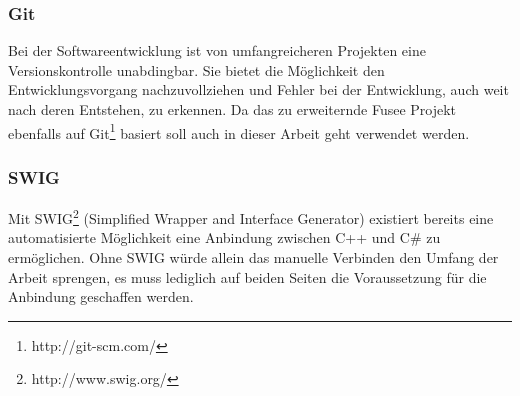 \subsubsection{Git}
Bei der Softwareentwicklung ist von umfangreicheren Projekten eine Versionskontrolle unabdingbar. Sie bietet die Möglichkeit den Entwicklungsvorgang nachzuvollziehen und Fehler bei der Entwicklung, auch weit nach deren Entstehen, zu erkennen. Da das zu erweiternde Fusee Projekt ebenfalls auf Git\footnote{http://git-scm.com/} basiert soll auch in dieser Arbeit geht verwendet werden.
\cite{Loeliger.2012}

\subsubsection{SWIG}
Mit SWIG\footnote{http://www.swig.org/} (Simplified Wrapper and Interface Generator) existiert bereits eine automatisierte Möglichkeit eine Anbindung zwischen C++ und C\# zu ermöglichen. Ohne SWIG würde allein das manuelle Verbinden den Umfang der Arbeit sprengen, es muss lediglich auf beiden Seiten die Voraussetzung für die Anbindung geschaffen werden.